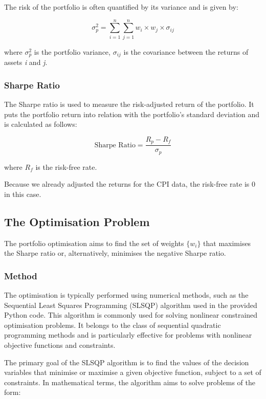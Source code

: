 \documentclass{article}
\begin{document}
The risk of the portfolio is often quantified by its variance and is given by:

\begin{equation}
\sigma_p^2 = \sum_{i=1}^{n} \sum_{j=1}^{n} w_i \times w_j \times \sigma_{ij}
\end{equation}

where \( \sigma_p^2 \) is the portfolio variance, \( \sigma_{ij} \) is the covariance between the returns of assets \textit{i} and \textit{j}.

\subsubsection*{Sharpe Ratio}

The Sharpe ratio is used to measure the risk-adjusted return of the portfolio. It puts the portfolio return into relation with the portfolio's standard deviation and is calculated as follows:

\begin{equation}
\text{Sharpe Ratio} = \frac{R_p - R_f}{\sigma_p}
\end{equation}

where \( R_f \) is the risk-free rate.

Because we already adjusted the returns for the CPI data, the risk-free rate is 0 in this case.

\subsection{The Optimisation Problem}

The portfolio optimisation aims to find the set of weights \( \{ w_i \} \) that maximises the Sharpe ratio or, alternatively, minimises the negative Sharpe ratio.

\subsubsection*{Method}

The optimisation is typically performed using numerical methods, such as the Sequential Least Squares Programming (SLSQP) algorithm used in the provided Python code. This algorithm is commonly used for solving nonlinear constrained optimisation problems. It belongs to the class of sequential quadratic programming methods and is particularly effective for problems with nonlinear objective functions and constraints.

The primary goal of the SLSQP algorithm is to find the values of the decision variables that minimise or maximise a given objective function, subject to a set of constraints. In mathematical terms, the algorithm aims to solve problems of the form:
\end{document}
